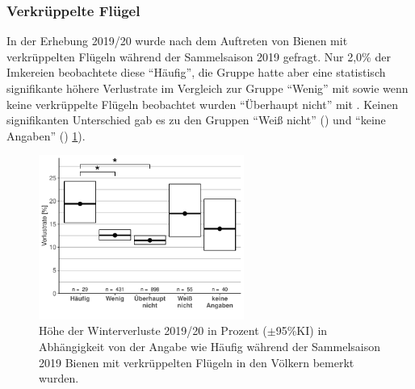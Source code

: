\subsubsection{Verkrüppelte Flügel}
\label{ss:verkeuppelte_fluegel:U}

In der Erhebung 2019/20 wurde nach dem Auftreten von Bienen mit verkrüppelten Flügeln während der Sammelsaison 2019 gefragt. Nur 2,0\% der Imkereien beobachtete diese \enquote{Häufig}, die Gruppe hatte aber eine statistisch signifikante höhere Verlustrate  im Vergleich zur Gruppe \enquote{Wenig} mit  sowie wenn keine verkrüppelte Flügeln beobachtet wurden \enquote{Überhaupt nicht} mit . Keinen signifikanten Unterschied gab es zu den Gruppen \enquote{Weiß nicht} () und \enquote{keine Angaben} () \cref{fig:u:queen:crippledbees}).

\begin{figure}[H]
  \centering
  \includegraphics[keepaspectratio,width=0.6\textwidth]{project-U-wintersterblichkeit/figures/plot_factor_crippledbees}
  \caption{Höhe der Winterverluste 2019/20 in Prozent ($\pm$95\%KI) in Abhängigkeit von der Angabe wie Häufig während der Sammelsaison 2019 Bienen mit verkrüppelten Flügeln in den Völkern bemerkt wurden.}
  \label{fig:u:queen:crippledbees}
\end{figure}